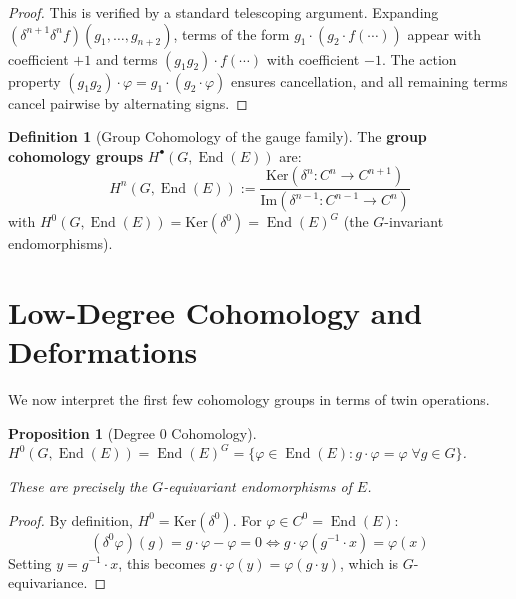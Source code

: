 \documentclass[11pt,a4paper,openany]{book}
\theoremstyle{plain}
\newtheorem{proposition}[theorem]{Proposition}
\theoremstyle{definition}
\newtheorem{definition}[theorem]{Definition}
\newcommand{\actspace}{E}
\newcommand{\groupG}{G}
\newcommand{\Ker}{\mathrm{Ker}}
\newcommand{\Img}{\mathrm{Im}}
\DeclareMathOperator{\End}{End}
\begin{document}
\begin{proof}
This is verified by a standard telescoping argument. Expanding $(\delta^{n+1}\delta^n f)(g_1, \ldots, g_{n+2})$, terms of the form $g_1 \cdot (g_2 \cdot f(\cdots))$ appear with coefficient $+1$ and terms $(g_1 g_2) \cdot f(\cdots)$ with coefficient $-1$. The action property $(g_1 g_2) \cdot \varphi = g_1 \cdot (g_2 \cdot \varphi)$ ensures cancellation, and all remaining terms cancel pairwise by alternating signs.
\end{proof}

\begin{definition}[Group Cohomology of the gauge family]\label{def:hochschild-cohom}
The \textbf{group cohomology groups} $H^\bullet(\groupG,\End(\actspace))$ are:
\[
H^n(\groupG, \End(\actspace)) := \frac{\Ker(\delta^n : C^n \to C^{n+1})}{\Img(\delta^{n-1} : C^{n-1} \to C^n)}
\]
with $H^0(\groupG, \End(\actspace)) = \Ker(\delta^0) = \End(\actspace)^\groupG$ (the $\groupG$-invariant endomorphisms).
\end{definition}

\section{Low-Degree Cohomology and Deformations}

We now interpret the first few cohomology groups in terms of twin operations.

\begin{proposition}[Degree 0 Cohomology]\label{prop:HH0}
$H^0(\groupG, \End(\actspace)) = \End(\actspace)^\groupG = \{\varphi \in \End(\actspace) : g \cdot \varphi = \varphi \;\forall g \in \groupG\}$.

These are precisely the $\groupG$-equivariant endomorphisms of $\actspace$.
\end{proposition}

\begin{proof}
By definition, $H^0 = \Ker(\delta^0)$. For $\varphi \in C^0 = \End(\actspace)$:
\[
(\delta^0 \varphi)(g) = g \cdot \varphi - \varphi = 0 \iff g \cdot \varphi(g^{-1} \cdot x) = \varphi(x)
\]
Setting $y = g^{-1} \cdot x$, this becomes $g \cdot \varphi(y) = \varphi(g \cdot y)$, which is $\groupG$-equivariance.
\end{proof}
\end{document}
